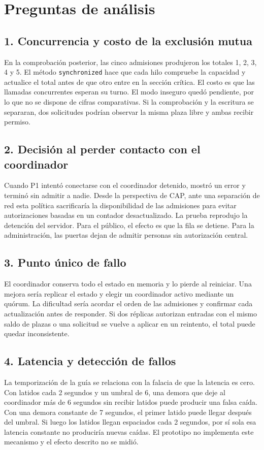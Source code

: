 \documentclass[11pt,a4paper]{article}
\begin{document}
\newpage
\section*{Preguntas de análisis}
\subsection*{1. Concurrencia y costo de la exclusión mutua}
En la comprobación posterior, las cinco admisiones produjeron los totales 1, 2, 3, 4 y 5. El método \texttt{synchronized} hace que cada hilo compruebe la capacidad y actualice el total antes de que otro entre en la sección crítica. El costo es que las llamadas concurrentes esperan su turno. El modo inseguro quedó pendiente, por lo que no se dispone de cifras comparativas. Si la comprobación y la escritura se separaran, dos solicitudes podrían observar la misma plaza libre y ambas recibir permiso.

\subsection*{2. Decisión al perder contacto con el coordinador}
Cuando P1 intentó conectarse con el coordinador detenido, mostró un error y terminó sin admitir a nadie. Desde la perspectiva de CAP, ante una separación de red esta política sacrificaría la disponibilidad de las admisiones para evitar autorizaciones basadas en un contador desactualizado. La prueba reprodujo la detención del servidor. Para el público, el efecto es que la fila se detiene. Para la administración, las puertas dejan de admitir personas sin autorización central.

\subsection*{3. Punto único de fallo}
El coordinador conserva todo el estado en memoria y lo pierde al reiniciar. Una mejora sería replicar el estado y elegir un coordinador activo mediante un quórum. La dificultad sería acordar el orden de las admisiones y confirmar cada actualización antes de responder. Si dos réplicas autorizan entradas con el mismo saldo de plazas o una solicitud se vuelve a aplicar en un reintento, el total puede quedar inconsistente.

\subsection*{4. Latencia y detección de fallos}
La temporización de la guía se relaciona con la falacia de que la latencia es cero. Con latidos cada 2 segundos y un umbral de 6, una demora que deje al coordinador más de 6 segundos sin recibir latidos puede producir una falsa caída. Con una demora constante de 7 segundos, el primer latido puede llegar después del umbral. Si luego los latidos llegan espaciados cada 2 segundos, por sí sola esa latencia constante no produciría nuevas caídas. El prototipo no implementa este mecanismo y el efecto descrito no se midió.
\end{document}

